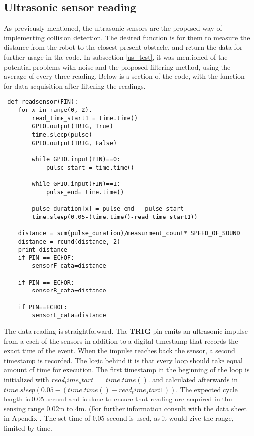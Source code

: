 \subsection{Ultrasonic sensor reading}


As previously mentioned, the ultrasonic sensors are the proposed way of implementing collision detection. The desired function is for them to measure the distance from the robot to the closest present obstacle, and return the data for further usage in the code.
In subsection \ref{us_test}, it was mentioned of the potential problems with noise and the proposed filtering method, using the average of every three reading. 
Below is a section of the code, with the function for data acquisition after filtering the readings.

\begin{lstlisting}
 def readsensor(PIN):
	for x in range(0, 2):
		read_time_start1 = time.time()
		GPIO.output(TRIG, True)
		time.sleep(pulse)
		GPIO.output(TRIG, False)

		while GPIO.input(PIN)==0:
			pulse_start = time.time()

		while GPIO.input(PIN)==1:
			pulse_end= time.time()

		pulse_duration[x] = pulse_end - pulse_start
		time.sleep(0.05-(time.time()-read_time_start1))

	distance = sum(pulse_duration)/measurment_count* SPEED_OF_SOUND
	distance = round(distance, 2)
	print distance
	if PIN == ECHOF:
		sensorF_data=distance

	if PIN == ECHOR:
		sensorR_data=distance

	if PIN==ECHOL:
		sensorL_data=distance
\end{lstlisting}

The data reading is straightforward. The \textbf{TRIG} pin emits an ultrasonic impulse from a each of the sensors in addition to a digital timestamp that records the exact time of the event. When the impulse reaches back the sensor, a second timestamp is recorded. The logic behind it is that every loop should take equal amount of time for execution. 
The first timestamp in the beginning of the loop is initialized with \textbf{$read_time_start1 = time.time().$} and calculated afterwards in \textbf{$time.sleep(0.05-(time.time()-read_time_start1))$}. The expected cycle length is 0.05 second and is done to ensure that reading are acquired in the sensing range 0.02m to 4m. (For further information consult with the data sheet in Apendix . 
The set time of 0.05 second is used, as it would give the range, limited by time.

